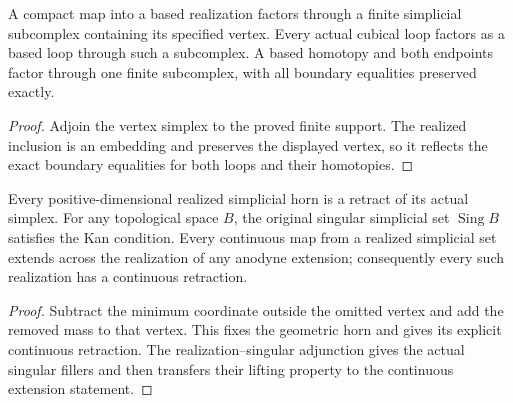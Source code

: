 \begin{proposition}
  \label{prop:actual-based-finite-simplicial-support}
  \leanok
  A compact map into a based realization factors through a finite simplicial subcomplex containing its specified vertex. Every actual cubical loop factors as a based loop through such a subcomplex. A based homotopy and both endpoints factor through one finite subcomplex, with all boundary equalities preserved exactly.
\end{proposition}
\begin{proof}
  Adjoin the vertex simplex to the proved finite support. The realized inclusion is an embedding and preserves the displayed vertex, so it reflects the exact boundary equalities for both loops and their homotopies.
  \leanok
\end{proof}

\begin{proposition}
  \label{prop:actual-singular-kan-fillers}
  \leanok
  Every positive-dimensional realized simplicial horn is a retract of its actual simplex. For any topological space $B$, the original singular simplicial set $\operatorname{Sing}B$ satisfies the Kan condition. Every continuous map from a realized simplicial set extends across the realization of any anodyne extension; consequently every such realization has a continuous retraction.
\end{proposition}
\begin{proof}
  Subtract the minimum coordinate outside the omitted vertex and add the removed mass to that vertex. This fixes the geometric horn and gives its explicit continuous retraction. The realization--singular adjunction gives the actual singular fillers and then transfers their lifting property to the continuous extension statement.
  \leanok
\end{proof}

